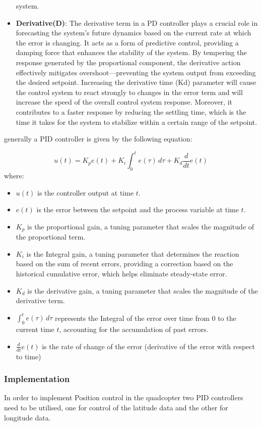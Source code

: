\documentclass{article}
\begin{document}
\begin{itemize}
  system.
  \item \textbf{Derivative(D)}: The derivative term in a PD controller plays a
  crucial role in forecasting the system's future dynamics based on the current
  rate at which the error is changing. It acts as a form of predictive control,
  providing a damping force that enhances the stability of the system. By
  tempering the response generated by the proportional component, the derivative
  action effectively mitigates overshoot—preventing the system output from
  exceeding the desired setpoint. Increasing the derivative time (Kd) parameter
  will cause the control system to react strongly to changes in the error term
  and will increase the speed of the overall control system response. Moreover,
  it contributes to a faster response by reducing the settling time, which is
  the time it takes for the system to stabilize within a certain range of the
  setpoint.
\end{itemize}
generally a PID controller is given by the following equation: 

\begin{equation}
  u(t) = K_p e(t) + K_i \int_{0}^{t} e(\tau) \, d\tau + K_d \frac{d}{dt} e(t)
\end{equation}
where:
\begin{itemize}
    \item $u(t)$ is the controller output at time $t$.
    \item $e(t)$ is the error between the setpoint and the process variable at
    time $t$.
    \item $K_p$ is the proportional gain, a tuning parameter that scales the
    magnitude of the proportional term.
    \item $K_i$ is the Integral gain, a tuning parameter that determines the
    reaction based on the sum of recent errors, providing a correction based on
    the historical cumulative error, which helps eliminate steady-state error.
    \item $K_d$ is the derivative gain, a tuning parameter that scales the
    magnitude of the derivative term.
    \item $\int_{0}^{t} e(\tau) \, d\tau$ represents the Integral of the error
    over time from 0 to the current time $t$, accounting for the accumulation of
    past errors.
    \item $\frac{d}{dt} e(t)$ is the rate of change of the error (derivative of
    the error with respect to time)
\end{itemize}
\subsubsection*{Implementation}
In order to implement Position control in the quadcopter two PID controllers
need to be utilised, one for control of the latitude data and the other for
longitude data. 
\end{document}
